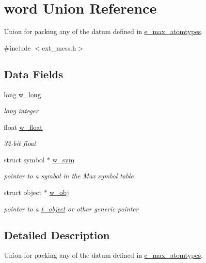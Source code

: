 \hypertarget{unionword}{
\section{word Union Reference}
\label{unionword}
}


Union for packing any of the datum defined in \hyperlink{group__atom_ga8aa6700e9f00b132eb376db6e39ade47}{e\_\-max\_\-atomtypes}.  


{\ttfamily \#include $<$ext\_\-mess.h$>$}\subsection*{Data Fields}
\begin{DoxyCompactItemize}
\item 
\hypertarget{unionword_a6bc19a806142252aa3e84661a4b942a6}{
long \hyperlink{unionword_a6bc19a806142252aa3e84661a4b942a6}{w\_\-long}}
\label{unionword_a6bc19a806142252aa3e84661a4b942a6}

\begin{DoxyCompactList}\small\item\em long integer \item\end{DoxyCompactList}\item 
\hypertarget{unionword_aeae3bf563ba7513b0a954d480cb45c13}{
float \hyperlink{unionword_aeae3bf563ba7513b0a954d480cb45c13}{w\_\-float}}
\label{unionword_aeae3bf563ba7513b0a954d480cb45c13}

\begin{DoxyCompactList}\small\item\em 32-\/bit float \item\end{DoxyCompactList}\item 
\hypertarget{unionword_a979bae342fac8dbb9af68f15080bedbc}{
struct symbol $\ast$ \hyperlink{unionword_a979bae342fac8dbb9af68f15080bedbc}{w\_\-sym}}
\label{unionword_a979bae342fac8dbb9af68f15080bedbc}

\begin{DoxyCompactList}\small\item\em pointer to a symbol in the Max symbol table \item\end{DoxyCompactList}\item 
\hypertarget{unionword_a1c1b743bf0274774ab01ad52de7fae1b}{
struct object $\ast$ \hyperlink{unionword_a1c1b743bf0274774ab01ad52de7fae1b}{w\_\-obj}}
\label{unionword_a1c1b743bf0274774ab01ad52de7fae1b}

\begin{DoxyCompactList}\small\item\em pointer to a \hyperlink{structt__object}{t\_\-object} or other generic pointer \item\end{DoxyCompactList}\end{DoxyCompactItemize}


\subsection{Detailed Description}
Union for packing any of the datum defined in \hyperlink{group__atom_ga8aa6700e9f00b132eb376db6e39ade47}{e\_\-max\_\-atomtypes}. 
